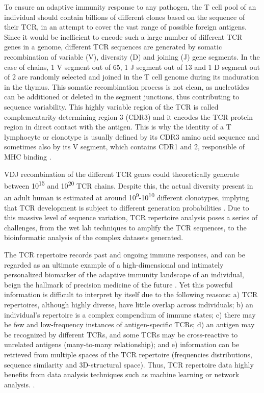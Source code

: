 To ensure an adaptive immunity response to any pathogen, the T cell pool of an individual should contain billions of different clones based on the sequence of their TCR, in an attempt to cover the vast range of possible foreign antigens. Since it would be inefficient to encode such a large number of different TCR genes in a genome, different TCR sequences are generated by somatic recombination of variable (V), diversity (D) and joining (J) gene segments. In the case of \TCRB{} chains, 1 V segment out of 65, 1 J segment out of 13 and 1 D segment out of 2 are randomly selected and joined in the T cell genome during its maduration in the thymus. This somatic recombination process is not clean, as nucleotides can be additioned or deleted in the segment junctions, thus contributing to sequence variability. This highly variable region of the TCR is called complementarity-determining region 3 (CDR3) and it encodes the TCR protein region in direct contact with the antigen. This is why the identity of a T lymphocyte or clonotype is usually defined by its CDR3 amino acid sequence and sometimes also by its V segment, which contains CDR1 and 2, responsible of MHC binding \citep{cdr12mhc}.

VDJ recombination of the different TCR genes could theoretically generate between 10\textsuperscript{15} and 10\textsuperscript{20} TCR chains. Despite this, the actual diversity present in an adult human is estimated at around 10\textsuperscript{9}-10\textsuperscript{10} different clonotypes, implying that TCR development is subject to different generation probabilities \citep{tcrdiv}. Due to this massive level of sequence variation, TCR repertoire analysis poses a series of challenges, from the wet lab techniques to amplify the TCR sequences, to the bioinformatic analysis of the complex datasets generated.

The TCR repertoire records past and ongoing immune responses, and can be regarded as an ultimate example of a high-dimensional and intimately personalized biomarker of the adaptive immunity landscape of an individual, beign the hallmark of precision medicine of the future \citep{pitfallsoport}. Yet this powerful information is difficult to interpret by itself due to the following reasons: a) TCR repertoires, although highly diverse, have little overlap across individuals; b) an individual's repertoire is a complex compendium of immune states; c) there may be few and low-frequency instances of antigen-specific TCRs; d) an antigen may be recognized by different TCRs, and some TCRs may be cross-reactive to unrelated antigens (many-to-many relationship); and e) information can be retrieved from multiple spaces of the TCR repertoire (frequencies distributions, sequence similarity and 3D-structural space). Thus, TCR repertoire data highly benefits from data analysis techniques such as machine learning or network analysis. \citep{tcrml}.

